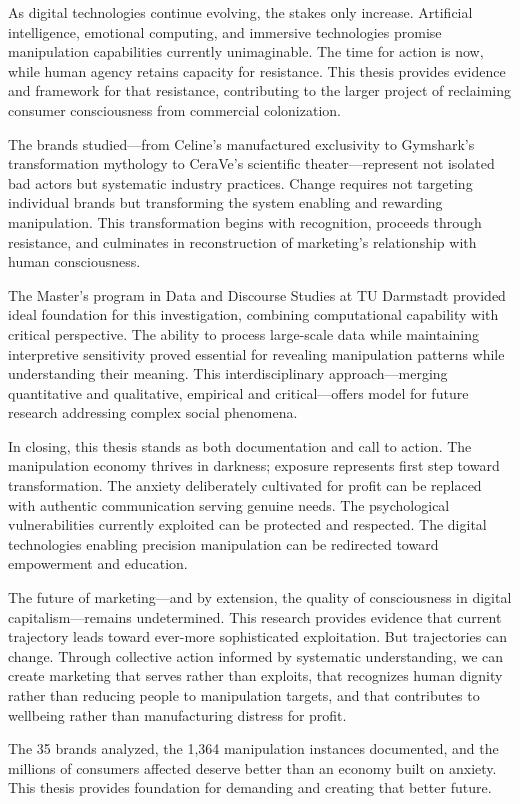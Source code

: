 As digital technologies continue evolving, the stakes only increase. Artificial intelligence, emotional computing, and immersive technologies promise manipulation capabilities currently unimaginable. The time for action is now, while human agency retains capacity for resistance. This thesis provides evidence and framework for that resistance, contributing to the larger project of reclaiming consumer consciousness from commercial colonization.

The brands studied—from Celine's manufactured exclusivity to Gymshark's transformation mythology to CeraVe's scientific theater—represent not isolated bad actors but systematic industry practices. Change requires not targeting individual brands but transforming the system enabling and rewarding manipulation. This transformation begins with recognition, proceeds through resistance, and culminates in reconstruction of marketing's relationship with human consciousness.

The Master's program in Data and Discourse Studies at TU Darmstadt provided ideal foundation for this investigation, combining computational capability with critical perspective. The ability to process large-scale data while maintaining interpretive sensitivity proved essential for revealing manipulation patterns while understanding their meaning. This interdisciplinary approach—merging quantitative and qualitative, empirical and critical—offers model for future research addressing complex social phenomena.

In closing, this thesis stands as both documentation and call to action. The manipulation economy thrives in darkness; exposure represents first step toward transformation. The anxiety deliberately cultivated for profit can be replaced with authentic communication serving genuine needs. The psychological vulnerabilities currently exploited can be protected and respected. The digital technologies enabling precision manipulation can be redirected toward empowerment and education.

The future of marketing—and by extension, the quality of consciousness in digital capitalism—remains undetermined. This research provides evidence that current trajectory leads toward ever-more sophisticated exploitation. But trajectories can change. Through collective action informed by systematic understanding, we can create marketing that serves rather than exploits, that recognizes human dignity rather than reducing people to manipulation targets, and that contributes to wellbeing rather than manufacturing distress for profit.

The 35 brands analyzed, the 1,364 manipulation instances documented, and the millions of consumers affected deserve better than an economy built on anxiety. This thesis provides foundation for demanding and creating that better future.